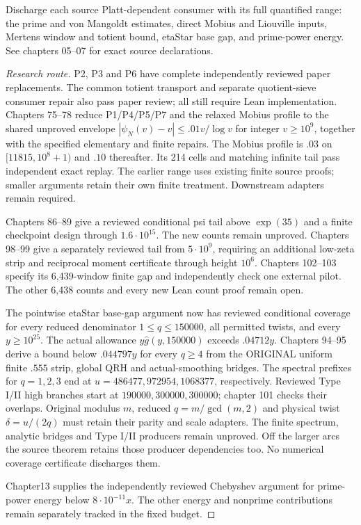 \begin{theorem}\label{minorinputs}\notready
Discharge each source Platt-dependent consumer with its full quantified
range: the prime and von Mangoldt estimates, direct Mobius and Liouville
inputs, Mertens window and totient bound, etaStar base gap,
and prime-power energy. See chapters 05--07 for exact source declarations.
\end{theorem}
\begin{proof}[Research route]
P2, P3 and P6 have complete independently reviewed paper replacements.
The common totient transport and separate quotient-sieve consumer repair
also pass paper review; all still require Lean implementation.
Chapters 75--78 reduce P1/P4/P5/P7 and the relaxed Mobius profile to
the shared unproved envelope $|\psi_N(v)-v|\le .01v/\log v$ for integer
$v\ge10^9$, together with the specified elementary and finite repairs.
The Mobius profile is $.03$ on $[11815,10^8+1)$ and $.10$ thereafter.
Its 214 cells and matching infinite tail pass independent exact replay.
The earlier range uses existing finite source proofs; smaller arguments
retain their own finite treatment. Downstream adapters remain required.

Chapters 86--89 give a reviewed conditional psi tail above $\exp(35)$
and a finite checkpoint design through $1.6\cdot10^{15}$.
The new counts remain unproved. Chapters 98--99 give a separately reviewed
tail from $5\cdot10^9$, requiring an additional low-zeta strip and reciprocal
moment certificate through height $10^6$. Chapters 102--103 specify its
6,439-window finite gap and independently check one external pilot.
The other 6,438 counts and every new Lean count proof remain open.

The pointwise etaStar base-gap argument now has reviewed conditional
coverage for every reduced denominator $1\le q\le150000$, all permitted
twists, and every $y\ge10^{25}$. The actual allowance
$y\widehat g(y,150000)$ exceeds $.04712y$. Chapters 94--95 derive
a bound below $.044797y$ for every $q\ge4$ from the ORIGINAL uniform
finite $.555$ strip, global QRH and actual-smoothing bridges.
The spectral prefixes for $q=1,2,3$ end at
$u=486477,972954,1068377$, respectively. Reviewed Type I/II high branches
start at $190000,300000,300000$; chapter 101 checks their overlaps.
Original modulus $m$, reduced $q=m/\gcd(m,2)$ and physical twist
$\delta=u/(2q)$ must retain their parity and scale adapters.
The finite spectrum, analytic bridges and Type I/II producers remain
unproved. Off the larger arcs the source theorem retains those producer
dependencies too. No numerical coverage certificate discharges them.

Chapter13 supplies the independently reviewed Chebyshev argument for
prime-power energy below $8\cdot10^{-11}x$. The other energy and
nonprime contributions remain separately tracked in the fixed budget.
\end{proof}

